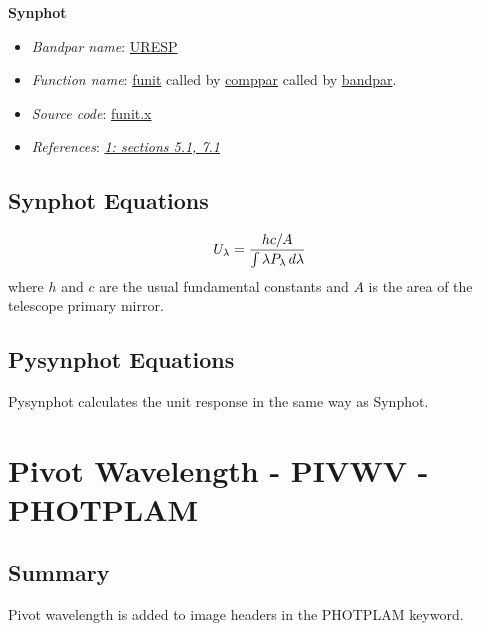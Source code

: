 \documentclass[letterpaper,10pt,english]{sphinxtsr}
\begin{document}
\textbf{Synphot}
\begin{itemize}
\item {} 
\emph{Bandpar name}: \href{https://svn.stsci.edu/trac/ssb/stsci\_python/browser/stsdas/trunk/stsdas/pkg/hst\_calib/synphot/doc/bandpar.hlp}{URESP}

\item {} 
\emph{Function name}: \href{https://svn.stsci.edu/trac/ssb/stsci\_python/browser/stsdas/trunk/stsdas/lib/synphot/funit.x}{funit}
called by \href{https://svn.stsci.edu/trac/ssb/stsci\_python/browser/stsdas/trunk/stsdas/pkg/hst\_calib/synphot/bandpar/comppar.x}{comppar} called by \href{https://svn.stsci.edu/trac/ssb/stsci\_python/browser/stsdas/trunk/stsdas/pkg/hst\_calib/synphot/bandpar/bandpar.x}{bandpar}.

\item {} 
\emph{Source code}: \href{https://svn.stsci.edu/trac/ssb/stsci\_python/browser/stsdas/trunk/stsdas/lib/synphot/funit.x}{funit.x}

\item {} 
\emph{References}: {\hyperref[references:ref1]{\emph{1: sections 5.1, 7.1}}}

\end{itemize}


\section{Synphot Equations}
\label{main:id17}\begin{gather}
\begin{split}U_{\lambda} = \frac{hc/A}{\int \lambda P_{\lambda}\,d\lambda}\end{split}\notag
\end{gather}
where $h$ and $c$ are the usual fundamental constants and
$A$ is the area of the telescope primary mirror.


\section{Pysynphot Equations}
\label{main:id18}
Pysynphot calculates the unit response in the same way as Synphot.


\chapter{Pivot Wavelength - PIVWV - PHOTPLAM}
\label{main:pivot-wavelength-pivwv-photplam}

\section{Summary}
\label{main:id19}
Pivot wavelength is added to image headers in the PHOTPLAM keyword.
\end{document}
